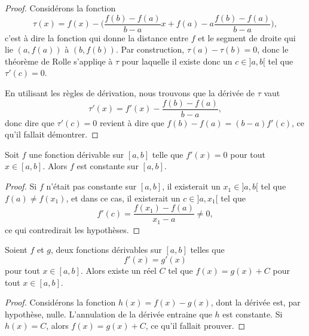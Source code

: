 \begin{proof}
    Considérons la fonction
    \begin{equation}
        \tau(x)=f(x)-\big( \frac{ f(b)-f(a) }{ b-a }x + f(a) - a\frac{ f(b)-f(a) }{ b-a } \big),
    \end{equation}
    c'est à dire la fonction qui donne la distance entre $f$ et le segment de droite qui lie $(a,f(a))$ à $(b,f(b))$. Par construction, $\tau(a)-\tau(b)=0$, donc le théorème de Rolle s'appliqe à $\tau$ pour laquelle il existe donc un $c\in]a,b[$ tel que $\tau'(c)=0$.

    En utilisant les règles de dérivation, nous trouvons que la dérivée de $\tau$ vaut
    \begin{equation}
        \tau'(x)= f'(x)-\frac{ f(b)-f(a) }{ b-a },
    \end{equation}
    donc dire que $\tau'(c)=0$ revient à dire que $f(b)-f(a)=(b-a)f'(c)$, ce qu'il fallait démontrer.
\end{proof}

\begin{corollary}
Soit $f$ une fonction dérivable sur $[a,b]$ telle que $f'(x) = 0$ pour tout $x \in [a,b]$. Alors $f$ est constante sur $[a,b]$.
\end{corollary}

\begin{proof}
    Si $f$ n'était pas constante sur $[a,b]$, il existerait un $x_1\in ]a,b[$ tel que $f(a)\neq f(x_1)$, et dans ce cas, il existerait un $c\in]a,x_1[$ tel que 
    \begin{equation}
        f'(c)=\frac{ f(x_1)-f(a) }{ x_1-a }\neq 0,
    \end{equation}
    ce qui contredirait les hypothèses.
\end{proof}

\begin{corollary}
    Soient $f$ et $g$, deux fonctions dérivables sur $[a,b]$ telles que
    \begin{equation}
        f'(x) = g'(x)
    \end{equation}
    pour tout $x \in [a,b]$. Alors existe un réel $C$ tel que $f (x) = g (x) + C$ pour tout $x\in [a,b]$.
\end{corollary}

\begin{proof}
    Considérons la fonction $h(x)=f(x)-g(x)$, dont la dérivée est, par hypothèse, nulle. L'annulation de la dérivée entraine que $h$ est  constante. Si $h(x)=C$, alors $f(x)=g(x)+C$, ce qu'il fallait prouver.
\end{proof}
\addtocounter{numtho}{-1}

